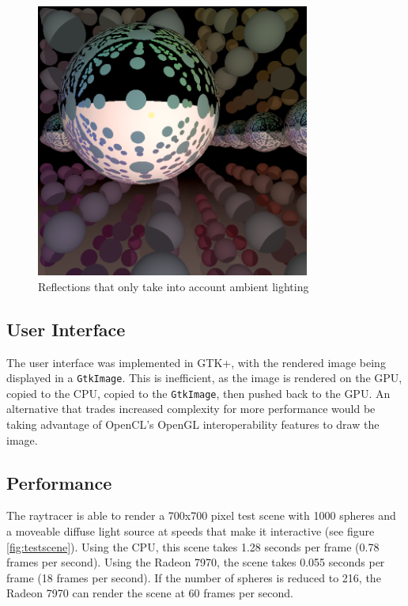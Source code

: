 \documentclass{article}
\begin{document}
\begin{figure}[ht!]
\centering
\includegraphics[width=90mm]{reflections.png}
\caption{Reflections that only take into account ambient lighting}
\label{fig:reflections}
\end{figure}

\subsection{User Interface}
The user interface was implemented in GTK+, with the rendered image being displayed in a \texttt{GtkImage}. This is inefficient, as the image is rendered on the GPU, copied to the CPU, copied to the \texttt{GtkImage}, then pushed back to the GPU. An alternative that trades increased complexity for more performance would be taking advantage of OpenCL's OpenGL interoperability features to draw the image.

\subsection{Performance}
The raytracer is able to render a 700x700 pixel test scene with 1000 spheres and a moveable diffuse light source at speeds that make it interactive (see figure \ref{fig:testscene}). Using the CPU, this scene takes 1.28 seconds per frame (0.78 frames per second). Using the Radeon 7970, the scene takes 0.055 seconds per frame (18 frames per second). If the number of spheres is reduced to 216, the Radeon 7970 can render the scene at 60 frames per second.
\end{document}
